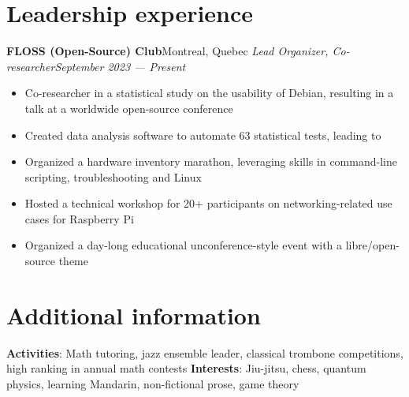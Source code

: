 \documentclass{article}
\newcommand{\newrole}[4]{
    {\normalfont\textbf{#1}\hfill#3}
    \newline
    \textit{#2}\hfill\textit{#4}
}
\newenvironment{bulletpoints}{\begin{itemize}\setlength\itemsep{-0.3em}}{\end{itemize}}
\begin{document}
\section*{Leadership experience}
\newrole{FLOSS (Open-Source) Club}{Lead Organizer, Co-researcher}{Montreal, Quebec}{September 2023 --- Present}
\begin{bulletpoints}
    \item Co-researcher in a statistical study on the usability of Debian, resulting in a talk at a worldwide open-source conference
    \item Created data analysis software to automate 63 statistical tests, leading to 
    \item Organized a hardware inventory marathon, leveraging skills in command-line scripting, troubleshooting and Linux
    \item Hosted a technical workshop for 20+ participants on networking-related use cases for Raspberry Pi
    \item Organized a day-long educational unconference-style event with a libre/open-source theme
\end{bulletpoints}


\section*{Additional information}
{\bfseries Activities}: Math tutoring, jazz ensemble leader, classical trombone competitions, high ranking in annual math contests
\newline
{\bfseries Interests}: Jiu-jitsu, chess, quantum physics, learning Mandarin, non-fictional prose, game theory
\end{document}
